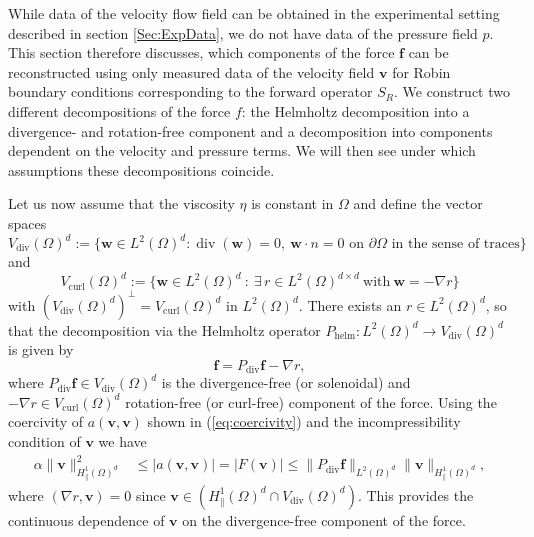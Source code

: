 \documentclass[final,leqno]{scrarticle}
\newcommand{\Htd}{{H^1_\|(\Omega)^d}}
\newcommand{\lzd}{{L^2(\Omega)^d}}
\renewcommand{\div}{\mathrm{div}}
\begin{document}
While data of the velocity flow field can be obtained in the experimental setting described in section \ref{Sec:ExpData}, we do not have data of the pressure field $p$.
This section therefore discusses, which components of the force $\mathbf{f}$ can be reconstructed using only measured data of the velocity field $\mathbf{v}$ for Robin boundary conditions corresponding to the forward operator $S_R$.
We construct two different decompositions of the force $f$: the Helmholtz decomposition into a divergence- and rotation-free component and a decomposition into components dependent on the velocity and pressure terms. We will then see under which assumptions these decompositions coincide.

Let us now assume that the viscosity $\eta$ is constant in $\Omega$ and define the vector spaces
\begin{displaymath}
    V_{\div} (\Omega)^d := \lbrace \mathbf{w} \in L^2(\Omega)^d :  \operatorname{div}(\mathbf{w}) = 0 , \ \mathbf{w} \cdot n = 0 \text{ on } \partial \Omega \text{ in the sense of traces} \rbrace
\end{displaymath}
and
\begin{displaymath}
V_{\operatorname{curl}}(\Omega)^d := \lbrace \mathbf{w} \in \lzd \ : \ \exists\, r \in L^2(\Omega)^{d\times d} \ \text{with} \ \mathbf{w} = - \nabla r \rbrace
\end{displaymath}
with $\left( V_{\div}(\Omega)^d \right)^\perp = V_{\operatorname{curl}}(\Omega)^d $ in $\lzd$.
There exists an $r \in \lzd$, so that the decomposition via the Helmholtz operator $P_{\mathrm{helm}} : \lzd \rightarrow  V_{\div}(\Omega)^d$ is given by  
\begin{displaymath}
    \mathbf{f} = P_{\operatorname{div}} \mathbf{f} - \nabla r,
\end{displaymath}
where $P_{\operatorname{div}} \mathbf{f} \in V_{\div}(\Omega)^d $ is the divergence-free (or solenoidal) and $- \nabla r \in V_{\operatorname{curl}}(\Omega)^d$ rotation-free (or curl-free) component of the force.
Using the coercivity of $a(\mathbf{v},\mathbf{v})$ shown in (\ref{eq:coercivity}) and the incompressibility condition of $\mathbf{v}$ we have
\begin{displaymath} 
    \begin{split}
    \alpha \| \mathbf{v} \|^2_\Htd &\leq | a (\mathbf{v},\mathbf{v}) | = | F(\mathbf{v}) |     \leq \|  P_{\operatorname{div}} \mathbf{f} \|_{\lzd} \| \mathbf{v} \|_{\Htd} ,
    \end{split}
\end{displaymath}
where $(\nabla r,\mathbf{v}) = 0$ since $ \mathbf{v} \in \left( \Htd \cap  V_{\div}(\Omega)^d \right) $.
This provides the continuous dependence of $\mathbf{v}$ on the divergence-free component of the force.
\end{document}
